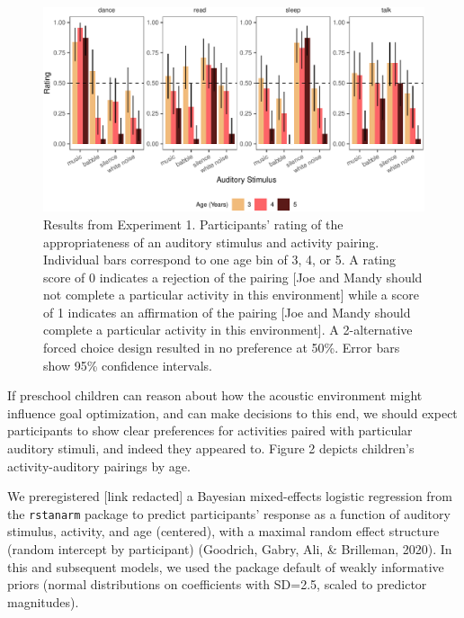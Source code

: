 \documentclass[10pt, letterpaper]{article}
\newenvironment{CodeChunk}{}{}
\begin{document}
\begin{CodeChunk}
\begin{figure}[t]

{\centering \includegraphics{figs/e3b-bar-1} 

}

\caption[Results from Experiment 1]{Results from Experiment 1. Participants' rating of the appropriateness of an auditory stimulus and activity pairing. Individual bars correspond to one age bin of 3, 4, or 5. A rating score of 0 indicates a rejection of the pairing [Joe and Mandy should not complete a particular activity in this environment] while a score of 1 indicates an affirmation of the pairing [Joe and Mandy should complete a particular activity in this environment]. A 2-alternative forced choice design resulted in no preference at 50\%.  Error bars show 95\% confidence intervals.}\label{fig:e3b-bar}
\end{figure}
\end{CodeChunk}

If preschool children can reason about how the acoustic environment
might influence goal optimization, and can make decisions to this end,
we should expect participants to show clear preferences for activities
paired with particular auditory stimuli, and indeed they appeared to.
Figure 2 depicts children's activity-auditory pairings by age.

We preregistered {[}link redacted{]} a Bayesian mixed-effects logistic
regression from the \texttt{rstanarm} package to predict participants'
response as a function of auditory stimulus, activity, and age
(centered), with a maximal random effect structure (random intercept by
participant) (Goodrich, Gabry, Ali, \& Brilleman, 2020). In this and
subsequent models, we used the package default of weakly informative
priors (normal distributions on coefficients with SD=2.5, scaled to
predictor magnitudes).
\end{document}
